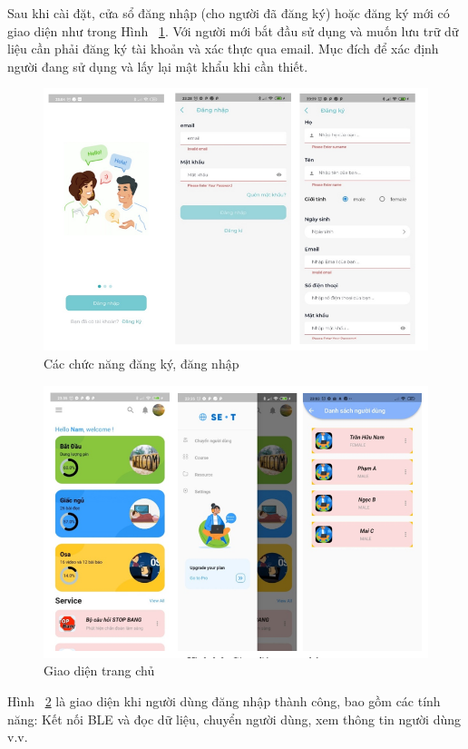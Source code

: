 Sau khi cài đặt, cửa sổ đăng nhập (cho người đã đăng ký) hoặc đăng ký mới có giao diện như trong Hình ~\ref{appAuth}. Với người mới bắt đầu sử dụng và muốn lưu trữ dữ liệu cần phải đăng ký tài khoản và xác thực qua email. Mục đích để xác định người đang sử dụng và lấy lại mật khẩu khi cần thiết.
\begin{figure} [h!]
    \centering
    \includegraphics[width=0.8\linewidth]{images/appAuth.png}
    \caption{Các chức năng đăng ký, đăng nhập}
    \label{appAuth}
\end{figure}

\begin{figure}[h!]
    \centering
    \includegraphics[width=0.8\linewidth]{images/app_cate.png}
    \caption{Giao diện trang chủ}
    \label{app_cate}
\end{figure}

Hình ~\ref{app_cate} là giao diện khi người dùng đăng nhập thành công, bao gồm các tính năng: Kết nối BLE và đọc dữ liệu, chuyển người dùng, xem thông tin người dùng v.v.


